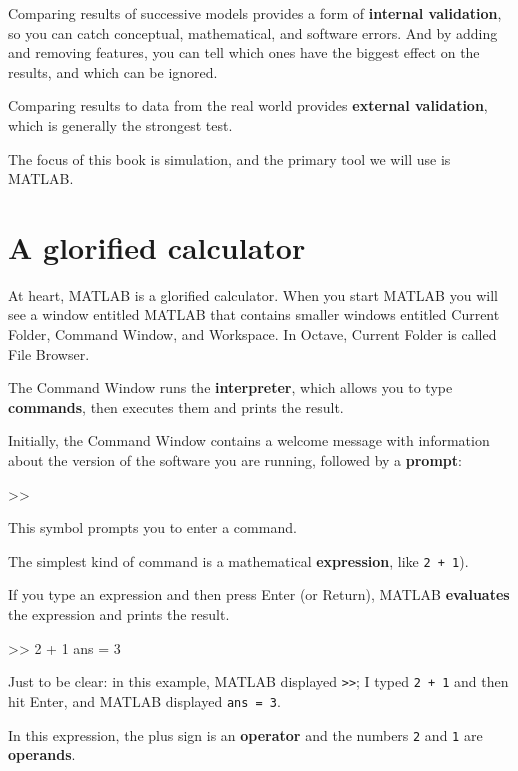 \documentclass[
]{book}
\numberwithin{Answer}{chapter}
\numberwithin{Exercise}{chapter}
\begin{document}
Comparing results of successive models provides a form of {\bf internal validation}, so you can catch conceptual, mathematical, and software errors.  And by adding and removing features, you can tell which ones have the biggest effect on the results, and which can be ignored.


Comparing results to data from the real world provides {\bf external validation}, which is generally the strongest test.

The focus of this book is simulation, and the primary tool we will use is MATLAB.

\section{A glorified calculator}
\label{sect:calc}

At heart, MATLAB is a glorified calculator.  When you start MATLAB
you will see a window
entitled {\sf MATLAB} that contains smaller windows entitled {\sf
Current Folder}, {\sf Command Window}, and {\sf Workspace}.
In Octave, {\sf Current Folder} is called {\sf File Browser}.

The Command Window runs the {\bf interpreter}, which allows you
to type {\bf commands}, then executes them and prints the
result.

Initially, the Command Window contains a welcome message with information
about the version of the software you are running, followed by a {\bf prompt}:

\begin{code}
>>
\end{code}

This symbol prompts you to enter a command.

The simplest kind of command is a mathematical {\bf expression},
like {\tt 2 + 1}).

If you type an expression and then press Enter (or Return), MATLAB
{\bf evaluates} the expression and prints the result.

\begin{code}
>> 2 + 1
ans = 3
\end{code}

Just to be clear: in this example, MATLAB displayed {\tt >>}; I
typed {\tt 2 + 1} and then hit Enter, and MATLAB displayed {\tt ans = 3}.

In this expression, the plus sign is an {\bf operator} and the numbers {\tt 2} and {\tt 1} are {\bf operands}.
\end{document}
